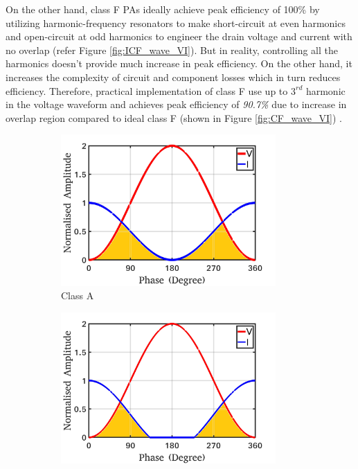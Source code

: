 \documentclass[conference]{IEEEtran}
\begin{document}
\color{blue}On the other hand, class  F \color{black} PAs \color{blue} ideally \color{black} achieve peak efficiency of 100\% by utilizing harmonic-frequency resonators to make short-circuit at even harmonics and open-circuit at odd harmonics to engineer the drain voltage and current with no overlap (refer Figure \ref{fig:ICF_wave_VI}). But in reality, controlling all the harmonics doesn't provide much increase in peak efficiency. On the other hand, it increases the complexity of circuit and component losses which in turn reduces efficiency. Therefore, practical implementation of class F use up to $3^{rd}$ harmonic in the voltage waveform and achieves peak efficiency of \textit{90.7\%} due to increase in overlap region compared to ideal class F (shown in Figure \ref{fig:CF_wave_VI}) \cite{Raab_max_eff}.
\begin{figure}[h]
\centering
\captionsetup{font=footnotesize}
\begin{subfigure}{0.24\textwidth}
\includegraphics[width=0.9\textwidth]{Images/Intro/ClassA_shaded.jpg}
\caption{Class A}
\label{fig:CA_wave_VI}
\end{subfigure}
\begin{subfigure}{0.24\textwidth}
\includegraphics[width=0.9\textwidth]{Images/Intro/ClassB_shaded.jpg}

\end{subfigure}
\end{figure}
\end{document}
